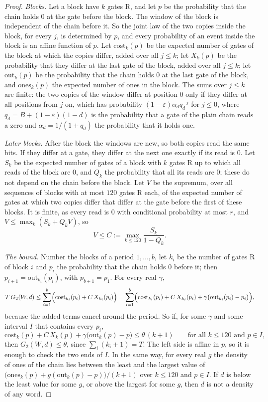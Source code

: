 \documentclass[11pt]{amsart}
\theoremstyle{definition}
\theoremstyle{remark}
\newcommand{\eps}{\varepsilon}
\begin{document}
\begin{proof}
\emph{Blocks.} Let a block have $k$ gates $\mathrm R$, and let $p$ be the probability that the
chain holds $0$ at the gate before the block. The window of the block is independent of the
chain before it. So the joint law of the two copies inside the block, for every $j$, is
determined by $p$, and every probability of an event inside the block is an affine function of
$p$. Let $\mathrm{cost}_k(p)$ be the expected number of gates of the block at which the copies
differ, added over all $j\le k$; let $X_k(p)$ be the probability that they differ at the last
gate of the block, added over all $j\le k$; let $\mathrm{out}_k(p)$ be the probability that the
chain holds $0$ at the last gate of the block, and $\mathrm{ones}_k(p)$ the expected number of
ones in the block. The sums over $j\le k$ are finite: the two copies of the window differ at
position $0$ only if they differ at all positions from $j$ on, which has probability
$(1-\eps)\alpha_dq_d^{-j}$ for $j\le0$, where $q_d=B+(1-\eps)(1-d)$ is the probability that a
gate of the plain chain reads a zero and $\alpha_d=1/(1+q_d)$ the probability that it holds one.

\emph{Later blocks.} After the block the windows are new, so both copies read the same bits.
If they differ at a gate, they differ at the next one exactly if its read is $0$. Let $S_k$ be
the expected number of gates of a block with $k$ gates $\mathrm R$ up to which all reads of the
block are $0$, and $Q_k$ the probability that all its reads are $0$; these do not depend on the
chain before the block. Let $V$ be the supremum, over all sequences of blocks with at most $120$
gates $\mathrm R$ each, of the expected
number of gates at which two copies differ that differ at the gate before the first of these
blocks. It is finite, as every read is $0$ with conditional probability at most $r$, and
$V\le\max_k(S_k+Q_kV)$, so
\[
V\le C:=\max_{k\le120}\frac{S_k}{1-Q_k}.
\]

\emph{The bound.} Number the blocks of a period $1,\dots,b$, let $k_i$ be the number of gates
$\mathrm R$ of block $i$ and $p_i$ the probability that the chain holds $0$ before it; then
$p_{i+1}=\mathrm{out}_{k_i}(p_i)$, with $p_{b+1}=p_1$. For every real $\gamma$,
\[
T\,G_2(W,d)\le\sum_{i=1}^b\Bigl(\mathrm{cost}_{k_i}(p_i)+C\,X_{k_i}(p_i)\Bigr)
=\sum_{i=1}^b\Bigl(\mathrm{cost}_{k_i}(p_i)+C\,X_{k_i}(p_i)+\gamma\bigl(\mathrm{out}_{k_i}(p_i)-p_i\bigr)\Bigr),
\]
because the added terms cancel around the period. So if, for some $\gamma$ and some interval $I$
that contains every $p_i$,
\begin{equation}\label{eq:scanB}
\mathrm{cost}_k(p)+C\,X_k(p)+\gamma\bigl(\mathrm{out}_k(p)-p\bigr)\le\theta\,(k+1)
\qquad\text{for all }k\le120\text{ and }p\in I,
\end{equation}
then $G_2(W,d)\le\theta$, since $\sum_i(k_i+1)=T$. The left side is affine in $p$, so it is
enough to check the two ends of $I$. In the same way, for every real $g$ the density of ones of
the chain lies between the least and the largest value of
$\bigl(\mathrm{ones}_k(p)+g(\mathrm{out}_k(p)-p)\bigr)/(k+1)$ over $k\le120$ and $p\in I$. If $d$
is below the least value for some $g$, or above the largest for some $g$, then $d$ is not a
density of any word.


\end{proof}
\end{document}
